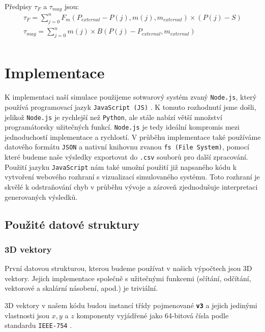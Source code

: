 Předpisy $\tau_F$ a $\tau_{mag}$ jsou:
\begin{equation}
    \label{eq:sim_equations2}
    \begin{gathered}
        \tau_F = \sum_{j=0}^{n} F_m(P_{external}- P(j), m(j), m_{external}) \times (P(j) - S)\\
        \tau_{mag} = \sum_{j=0}^{n} m(j) \times B(P(j)-P_{external},m_{external})\\
    \end{gathered}
\end{equation}

\section{Implementace}
K implementaci naší simulace použijeme sotwarový systém zvaný \texttt{Node.js}, který používá programovací jazyk \texttt{JavaScript (JS)} \cite{JS}. K tomuto rozhodnutí jsme došli, jelikož \texttt{Node.js} je rychlejší než \texttt{Python}, ale stále nabízí větší množství programátorsky užitečných funkcí. \texttt{Node.js} je tedy ideální kompromis mezi jednoduchostí implementace a rychlostí. V průběhu implementace také používáme datového formátu \texttt{JSON} \cite{JSON} a nativní knihovnu zvanou \texttt{fs (File System)}, pomocí které budeme naše výsledky exportovat do \texttt{.csv} souborů pro další zpracování. Použití jazyku \texttt{JavaScript} nám také umožní použití již napsaného kódu k vytvoření webového rozhraní s vizualizací simulovaného systému. Toto rozhraní je skvělé k odstraňování chyb v průběhu vývoje a zároveň zjednodušuje interpretaci generovaných výsledků.

\subsection{Použité datové struktury}

\subsubsection{3D vektory}

První datovou strukturou, kterou budeme používat v našich výpočtech jsou 3D vektory. Jejich implementace společně s užitečnými funkcemi (sčítání, odčítání, vektorové a skalární násobení, apod.) je triviální.

3D vektory v našem kódu budou instancí třídy pojmenované \textbf{\texttt{v3}} a jejich jedinými vlastnosti jsou $x,y$ a $z$ komponenty vyjádřené jako 64-bitová čísla podle standardu \texttt{IEEE-754} \cite{IEEE-754}.

